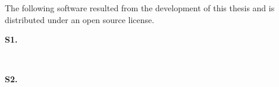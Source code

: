 The following software resulted from the development of this thesis and is
distributed under an open source license.

\begin{description}
  \item[\textbf{S1.}]~~\cite{rodriguesnasf4niopy}

  \item[\textbf{S2.}]~~\cite{rodrigueshascodemodels}
\end{description}